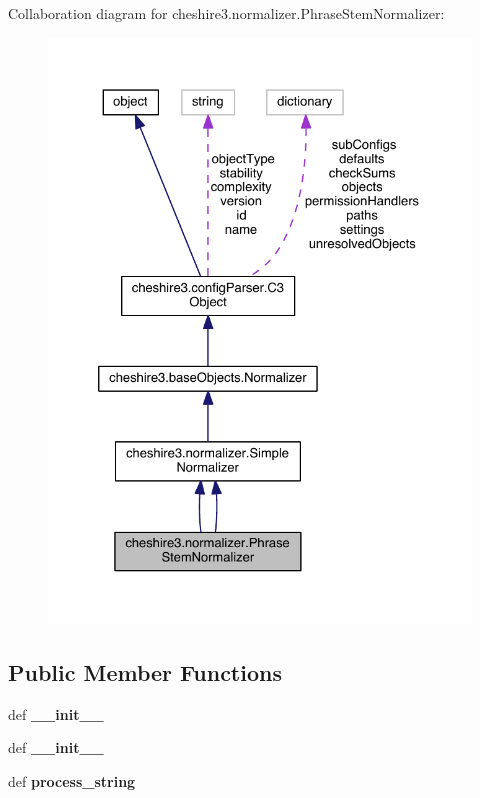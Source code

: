 Collaboration diagram for cheshire3.\-normalizer.\-Phrase\-Stem\-Normalizer\-:
\nopagebreak
\begin{figure}[H]
\begin{center}
\leavevmode
\includegraphics[width=328pt]{classcheshire3_1_1normalizer_1_1_phrase_stem_normalizer__coll__graph}
\end{center}
\end{figure}
\subsection*{Public Member Functions}
\begin{DoxyCompactItemize}
\item 
\hypertarget{classcheshire3_1_1normalizer_1_1_phrase_stem_normalizer_a0e78aa37acfa9ceb995b0f62ba85f3eb}{def {\bfseries \-\_\-\-\_\-init\-\_\-\-\_\-}}\label{classcheshire3_1_1normalizer_1_1_phrase_stem_normalizer_a0e78aa37acfa9ceb995b0f62ba85f3eb}

\item 
\hypertarget{classcheshire3_1_1normalizer_1_1_phrase_stem_normalizer_a0e78aa37acfa9ceb995b0f62ba85f3eb}{def {\bfseries \-\_\-\-\_\-init\-\_\-\-\_\-}}\label{classcheshire3_1_1normalizer_1_1_phrase_stem_normalizer_a0e78aa37acfa9ceb995b0f62ba85f3eb}

\item 
\hypertarget{classcheshire3_1_1normalizer_1_1_phrase_stem_normalizer_ac82a6fa1f04151c579c87919acbe091f}{def {\bfseries process\-\_\-string}}\label{classcheshire3_1_1normalizer_1_1_phrase_stem_normalizer_ac82a6fa1f04151c579c87919acbe091f}

\end{DoxyCompactItemize}
